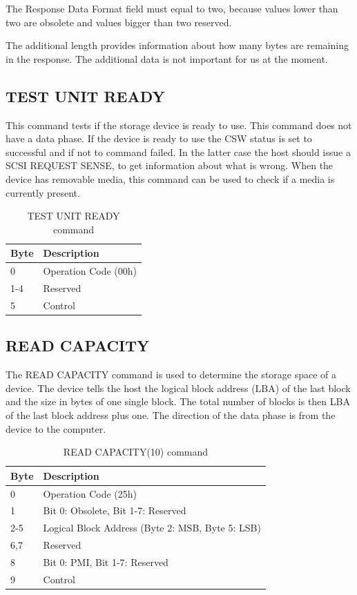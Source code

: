 The Response Data Format field must equal to two, because values lower than two are obsolete and values bigger than two reserved\cite{scsi_seagate}.

The additional length provides information about how many bytes are remaining in the response. The additional data is not important for us at the moment.

\subsection{TEST UNIT READY}

This command tests if the storage device is ready to use. This command does not have a data phase. If the device is ready to use the CSW status is set to successful and if not to command failed. In the latter case the host should issue a SCSI REQUEST SENSE, to get information about what is wrong. When the device has removable media, this command can be used to check if a media is currently present\cite{usb_ms_jan}.

\begin{table}[ht]
\caption{TEST UNIT READY command\cite{scsi_seagate}}
\centering
\begin{tabular}{|l|l|}
\hline\hline
\textbf{Byte} & \textbf{Description}\\ \hline
0 & Operation Code (00h)\\ \hline
1-4 & Reserved \\ \hline
5 & Control \\ \hline
\end{tabular}
\label{table:unit_ready}
\end{table}

\subsection{READ CAPACITY}

The READ CAPACITY command is used to determine the storage space of a device. The device tells the host the logical block address (LBA) of the last block and the size in bytes of one single block. The total number of blocks is then LBA of the last block address plus one. The direction of the data phase is from the device to the computer.

\begin{table}[ht]
\caption{READ CAPACITY(10) command\cite{scsi_seagate}}
\centering
\begin{tabular}{|l|l|}
\hline\hline
\textbf{Byte} & \textbf{Description}\\ \hline
0 & Operation Code (25h)\\ \hline
1 & Bit 0: Obsolete, Bit 1-7: Reserved \\ \hline
2-5 & Logical Block Address (Byte 2: MSB, Byte 5: LSB) \\ \hline
6,7 & Reserved \\ \hline
8 & Bit 0: PMI, Bit 1-7: Reserved \\ \hline
9 & Control \\ \hline
\end{tabular}
\label{table:read_capacity}
\end{table}

